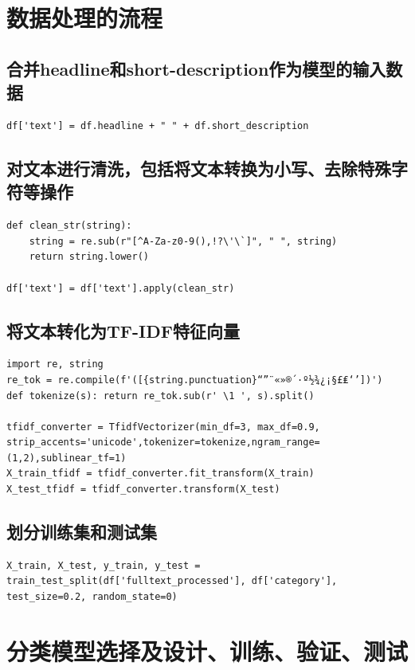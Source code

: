 \documentclass{article}
\begin{document}
\newpage
\section{ 数据处理的流程}
\subsection{合并headline和short-description作为模型的输入数据}
\begin{lstlisting}
df['text'] = df.headline + " " + df.short_description
\end{lstlisting}
\subsection{对文本进行清洗，包括将文本转换为小写、去除特殊字符等操作}
\begin{lstlisting}
def clean_str(string):
    string = re.sub(r"[^A-Za-z0-9(),!?\'\`]", " ", string)
    return string.lower()

df['text'] = df['text'].apply(clean_str)
\end{lstlisting}
\subsection{将文本转化为TF-IDF特征向量}
\begin{lstlisting}
import re, string
re_tok = re.compile(f'([{string.punctuation}“”¨«»®´·º½¾¿¡§£₤‘’])')
def tokenize(s): return re_tok.sub(r' \1 ', s).split()

tfidf_converter = TfidfVectorizer(min_df=3, max_df=0.9, strip_accents='unicode',tokenizer=tokenize,ngram_range=(1,2),sublinear_tf=1)
X_train_tfidf = tfidf_converter.fit_transform(X_train)
X_test_tfidf = tfidf_converter.transform(X_test)
\end{lstlisting}
\subsection{划分训练集和测试集}
\begin{lstlisting}
X_train, X_test, y_train, y_test = train_test_split(df['fulltext_processed'], df['category'], test_size=0.2, random_state=0)
\end{lstlisting}


\section{分类模型选择及设计、训练、验证、测试}
\end{document}
